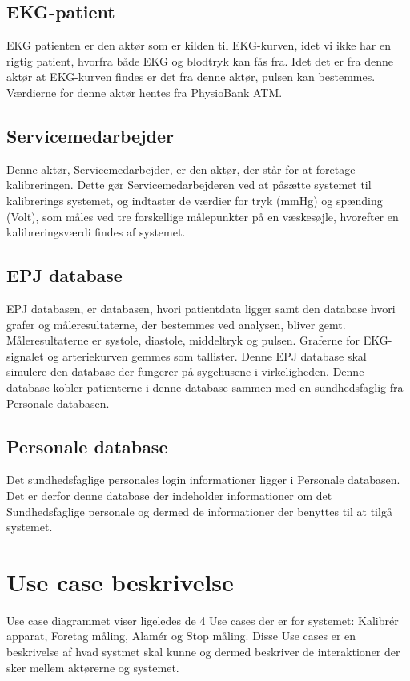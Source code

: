 \subsection{EKG-patient}
EKG patienten er den aktør som er kilden til EKG-kurven, idet vi ikke har en rigtig patient, hvorfra både EKG og blodtryk kan fås fra. Idet det er fra denne aktør at EKG-kurven findes er det fra denne aktør, pulsen kan bestemmes.\\
Værdierne for denne aktør hentes fra PhysioBank ATM.
\subsection{Servicemedarbejder}
Denne aktør, Servicemedarbejder, er den aktør, der står for at foretage kalibreringen. Dette gør Servicemedarbejderen ved at påsætte systemet til kalibrerings systemet, og indtaster de værdier for tryk (mmHg) og spænding (Volt), som måles ved tre forskellige målepunkter på en væskesøjle, hvorefter en kalibreringsværdi findes af systemet.
\subsection{EPJ database}
EPJ databasen, er databasen, hvori patientdata ligger samt den database hvori grafer og måleresultaterne, der bestemmes ved analysen, bliver gemt. Måleresultaterne er systole, diastole, middeltryk og pulsen.
Graferne for EKG-signalet og arteriekurven gemmes som tallister. Denne EPJ database skal simulere den database der fungerer på sygehusene i virkeligheden. Denne database kobler patienterne i denne database sammen med en sundhedsfaglig fra Personale databasen.
\subsection{Personale database}
Det sundhedsfaglige personales login informationer ligger i Personale databasen. Det er derfor denne database der indeholder informationer om det Sundhedsfaglige personale og dermed de informationer der benyttes til at tilgå systemet.
\section{Use case beskrivelse}
Use case diagrammet viser ligeledes de 4 Use cases der er for systemet: Kalibrér apparat, Foretag måling, Alamér og Stop måling. Disse Use cases er en beskrivelse af hvad systmet skal kunne og dermed beskriver de interaktioner der sker mellem aktørerne og systemet.
\\
